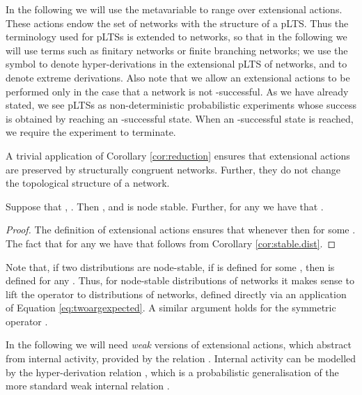 \documentclass{LMCS}
\begin{document}
\noindent In the following we will use the metavariable  to range 
over extensional actions. These actions endow the set of networks with the
structure of a pLTS. Thus the terminology used for pLTSs is extended to networks, 
so that in the following we will use terms such as finitary networks or finite branching networks; 
we use the symbol  to denote hyper-derivations in the 
extensional pLTS of networks, and  to denote extreme derivations.
Also note that we allow an extensional actions to 
be performed only in the case that a network is not -successful. 
As we have already stated, we see pLTSs as non-deterministic probabilistic experiments 
whose success is obtained by reaching an -successful state. When an 
-successful state is reached, we require the experiment to terminate.


A trivial application of Corollary \ref{cor:reduction} ensures that extensional actions 
are preserved by structurally congruent networks.
Further, they do not change the topological structure of a network.

\begin{prop}
\label{prop:static.topology}
Suppose that , 
. 
Then , and  is 
node stable. Further, for any  
we have that .
\end{prop}

\begin{proof}
The definition of extensional actions ensures that 
whenever  
then  for some 
. 
The fact that for any  
we have that  
follows from Corollary \ref{cor:stable.dist}.
\end{proof}
Note that, if two distributions  
are node-stable, if  is defined for some  
, then 
 is defined for any . Thus, for node-stable distributions 
of networks it makes sense to lift the operator  
to distributions of networks, defined directly via an application 
of Equation \ref{eq:twoargexpected}. A similar argument holds 
for the symmetric operator .

In the following we will need \emph{weak} versions of extensional actions, which
abstract from internal activity, 
provided by the relation . Internal activity can be modelled by 
the hyper-derivation relation , which is a probabilistic generalisation of 
the more standard weak internal relation . 
\end{document}
